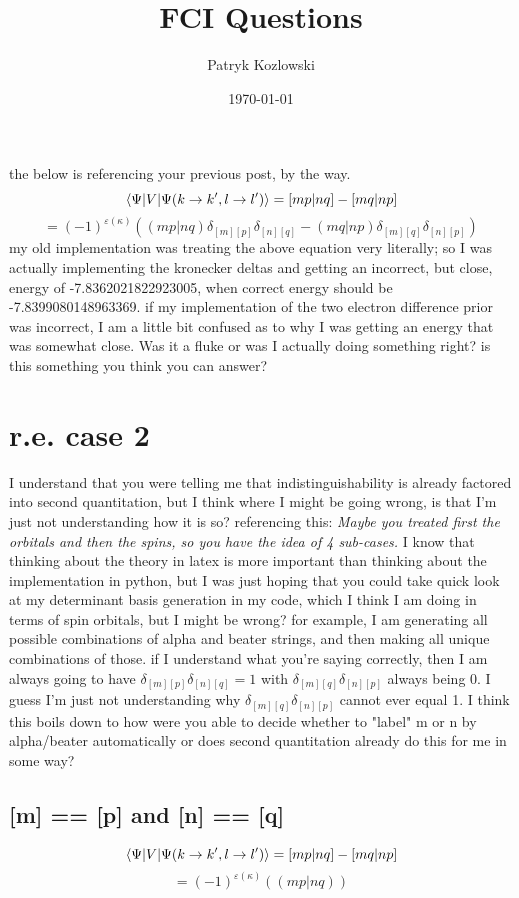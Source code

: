 \documentclass[12pt]{article}
\title{FCI Questions}
\author{Patryk Kozlowski}
\date{\today}
\begin{document}
\maketitle
the below is referencing your previous post, by the way.
\begin{equation}
    \mel{\Psi }{V}{\Psi (k\rightarrow k^{\prime}, l\rightarrow l^{\prime})}
    =[mp|nq]-[mq|np]
\end{equation}
\begin{equation}
    =(-1)^{\varepsilon (\kappa )}((mp|nq)\delta _{[m][p]}\delta _{[n][q]}-(mq|np)\delta _{[m][q]}\delta _{[n][p]})
\end{equation}
my old implementation was treating the above equation very literally; so I was actually implementing the kronecker deltas and getting an incorrect, but close, energy of -7.8362021822923005, when correct energy should be -7.8399080148963369. if my implementation of the two electron difference prior was incorrect, I am a little bit confused as to why I was getting an energy that was somewhat close. Was it a fluke or was I actually doing something right? is this something you think you can answer? 
\section{r.e. case 2}
I understand that you were telling me that indistinguishability is already factored into second quantitation, but I think where I might be going wrong, is that I'm just not understanding how it is so? referencing this: \emph{Maybe you treated first the orbitals and then the spins, so you have the idea of 4 sub-cases.} I know that thinking about the theory in latex is more important than thinking about the implementation in python, but I was just hoping that you could take quick look at my determinant basis generation in my code, which I think I am doing in terms of spin orbitals, but I might be wrong? for example, I am generating all possible combinations of alpha and beater strings, and then making all unique combinations of those. if I understand what you're saying correctly, then I am always going to have $\delta _{[m][p]}\delta _{[n][q]}=1$ with $\delta _{[m][q]}\delta _{[n][p]}$ always being 0. I guess I'm just not understanding why $\delta _{[m][q]}\delta _{[n][p]}$ cannot ever equal 1. I think this boils down to how were you able to decide whether to "label" m or n by alpha/beater automatically or does second quantitation already do this for me in some way? 
\subsection{[m] == [p] and [n] == [q]}
\begin{equation}
    \mel{\Psi }{V}{\Psi (k\rightarrow k^{\prime}, l\rightarrow l^{\prime})}
    =[mp|nq]-[mq|np]
\end{equation}
\begin{equation}
    =(-1)^{\varepsilon (\kappa )}((mp|nq))
\end{equation}
\end{document}
